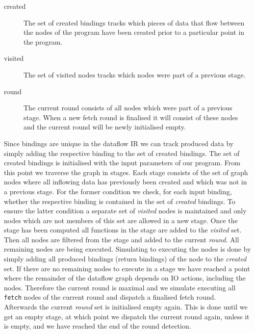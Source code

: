 \begin{description}
	\item[created] The set of created bindings tracks which pieces of data that flow between the nodes of the program have been created prior to a particular point in the program.
	\item[visited] The set of visited nodes tracks which nodes were part of a previous stage.
	\item[round] The current round consists of all \fetch{} nodes which were part of a previous stage.
	When a new fetch round is finalised it will consist of these \fetch{} nodes and the current round will be newly initialised empty.
\end{description}

Since bindings are unique in the dataflow IR we can track produced data by simply adding the respective binding to the set of created bindings.
The set of created bindings is initialised with the input parameters of our program.
From this point we traverse the graph in stages.
Each stage consists of the set of graph nodes where all inflowing data has previously been created and which was not in a previous stage.
For the former condition we check, for each input binding, whether the respective binding is contained in the set of \emph{created} bindings.
To ensure the latter condition a separate set of \emph{visited} nodes is maintained and only nodes which are not members of this set are allowed in a new stage.
Once the stage has been computed all functions in the stage are added to the \emph{visited} set.
Then all \fetch{} nodes are filtered from the stage and added to the current \emph{round}.
All remaining nodes are being executed.
Simulating to executing the nodes is done by simply adding all produced bindings (return bindings) of the node to the \emph{created} set.
If there are no remaining nodes to execute in a stage we have reached a point where the remainder of the dataflow graph depends on IO actions, including the \fetch{} nodes.
Therefore the current round is maximal and we simulate executing all \texttt{fetch} nodes of the current round and dispatch a finalised fetch round.
Afterwards the current \emph{round} set is initialised empty again.
This is done until we get an empty stage, at which point we dispatch the current round again, unless it is empty, and we have reached the end of the round detection.

